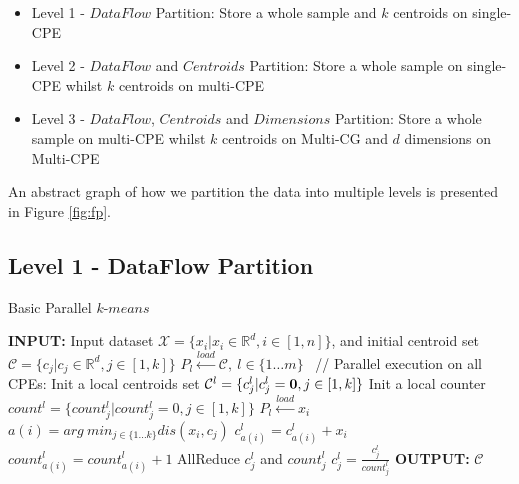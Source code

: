 \documentclass[10pt,journal,compsoc]{IEEEtran}
\begin{document}

\begin{itemize}

\item Level 1 - $DataFlow$ Partition: Store a whole sample and $k$ centroids on single-CPE 
\item Level 2 - $DataFlow$ and $Centroids$ Partition: Store a whole sample on single-CPE whilst $k$ centroids on multi-CPE
\item Level 3 - $DataFlow$,  $Centroids$ and $Dimensions$ Partition: Store a whole sample on multi-CPE whilst $k$ centroids on Multi-CG and $d$ dimensions on Multi-CPE

\end{itemize}

An abstract graph of how we partition the data into multiple levels is presented in Figure \ref{fig:fp}. 

\subsection{Level 1 - DataFlow Partition}

\begin{algorithm}
\caption{Basic Parallel $k$-$means$}
\label{alg:1}
\begin{algorithmic}[1]
\STATE \textbf{INPUT:} Input dataset $\mathcal{X} = \{x_i | x_i\in\mathds{R}^d, i\in[1, n]\}$, and initial centroid set $\mathcal{C} = \{c_j | c_j\in\mathds{R}^d, j\in[1,k]\}$
\STATE $P_l \xleftarrow{load} \mathcal{C},\ l \in \{1 \ldots m\}$ %
\REPEAT
\STATE \ // Parallel execution on all CPEs:
\STATE Init a local centroids set $\mathcal{C}^{l} = \{c_j^l | c_j^l = \text{\textbf{0}}, j\in[1,k]\}$
\STATE Init a local counter $count^l = \{count_j^l | count_j^l = \text{0}, j\in[1,k]\}$
\STATE $P_l \xleftarrow{load} x_i$ %
\STATE $a(i) = arg\ min_{j \in \{1 \ldots k \} } dis(x_i, c_j)$
\STATE $c_{a(i)}^l = c_{a(i)}^l + x_i$
\STATE $count_{a(i)}^l =count_{a(i)}^l+1$
\ENDFOR
\STATE AllReduce $c_j^l$ and $count_j^l$
\STATE $c_j^l =  \frac{c_j^l}{count_j^l}$
\ENDFOR
\ENDFOR
{}
\STATE \textbf{OUTPUT:} $\mathcal{C}$
\end{algorithmic}
\end{algorithm}
\end{document}
